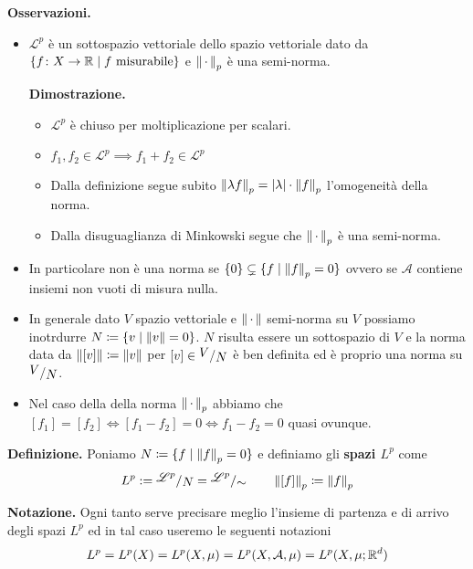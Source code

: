 \documentclass[a4paper, 12pt]{report}
\begin{document}
\textbf{Osservazioni.}
\begin{itemize}
	\item $\mathscr L^p$ è un sottospazio vettoriale dello spazio vettoriale dato da $\{ f \colon X \to \mathbb R \mid f \text{ misurabile} \}$ e $\left\lVert \,\cdot\, \right\rVert_p$ è una semi-norma.

		\textbf{Dimostrazione.}
		\begin{itemize}
			\item $\mathscr L^p$ è chiuso per moltiplicazione per scalari.

			\item $f_1, f_2 \in \mathscr L^p \implies f_1 + f_2 \in \mathscr L^p$

			\item Dalla definizione segue subito $\left\lVert \lambda f \right\rVert_p = |\lambda| \cdot \left\lVert f \right\rVert_p$ l'omogeneità della norma.

			\item Dalla disuguaglianza di Minkowski segue che $\left\lVert \,\cdot\, \right\rVert_p$ è una semi-norma.
		\end{itemize}

	\item In particolare non è una norma se $\{ 0 \} \subsetneq \{ f \mid \left\lVert f \right\rVert_p = 0 \}$ ovvero se $\mathcal A$ contiene insiemi non vuoti di misura nulla.

	\item In generale dato $V$ spazio vettoriale e $\left\lVert \,\cdot\, \right\rVert$ semi-norma su $V$ possiamo inotrdurre $N \coloneqq \{ v \mid \left\lVert v \right\rVert = 0 \}$. $N$ risulta essere un sottospazio di $V$ e la norma data da $\left\lVert [v] \right\rVert \coloneqq \left\lVert v \right\rVert$ per $[v] \in \sfrac{V}{N}$ è ben definita ed è proprio una norma su $\sfrac{V}{N}$.

	\item Nel caso della della norma $\left\lVert \,\cdot\, \right\rVert_p$ abbiamo che $[f_1] = [f_2] \iff [f_1 - f_2] = 0 \iff f_1 - f_2 = 0$ quasi ovunque. 
\end{itemize}

\textbf{Definizione.}
Poniamo $N \coloneqq \{ f \mid \left\lVert f \right\rVert_p = 0 \}$ e definiamo gli \textbf{spazi $L^p$} come
$$
L^p := \sfrac{\mathscr L^p}{N} = \sfrac{\mathscr L^p}{\sim} 
\qquad
\norm{[f]}_p \coloneqq \norm{f}_p
$$

\textbf{Notazione.}
Ogni tanto serve precisare meglio l'insieme di partenza e di arrivo degli spazi $L^p$ ed in tal caso useremo le seguenti notazioni
$$
L^p = L^p(X) = L^p(X, \mu) = L^p(X, \mathcal A, \mu) = L^p(X, \mu; \mathbb R^d)
$$
\end{document}
